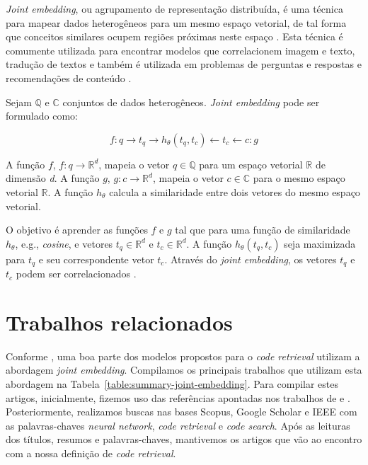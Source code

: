 \textit{Joint embedding}, ou agrupamento de representação distribuída, é uma técnica para mapear dados heterogêneos para um mesmo espaço vetorial, de tal forma que conceitos similares ocupem regiões próximas neste espaço \citep{Gu-deep-code-search:2018}. Esta técnica é comumente utilizada para encontrar modelos que correlacionem imagem e texto, tradução de textos e também é utilizada em problemas de perguntas e respostas e recomendações de conteúdo \citep{lai-etal-2018-review, Zhang:2019:deep-learning-recommender-survey}.

Sejam $\mathbb{Q}$ e $\mathbb{C}$ conjuntos de dados heterogêneos. \textit{Joint embedding} pode ser formulado como:

\begin{equation}
        f: q \rightarrow t_{q} \rightarrow h_{\theta}(t_{q}, t_{c}) \leftarrow t_{c} \leftarrow c :g
\end{equation}

A função $f$, $f: q \rightarrow \mathbb{R}^{d}$, mapeia o vetor  $q \in \mathbb{Q}$ para um espaço vetorial $\mathbb{R}$ de dimensão \emph{d}. A função $g$, $g: c \rightarrow \mathbb{R}^{d}$, mapeia o vetor $c \in \mathbb{C}$ para o mesmo espaço vetorial $\mathbb{R}$. A função $h_{\theta}$ calcula a similaridade entre dois vetores do mesmo espaço vetorial.


O objetivo é aprender as funções $f$ e $g$ tal que para uma função de similaridade $h_{\theta}$, e.g., \textit{cosine}, e vetores $t_{q} \in \mathbb{R}^{d}$ e $t_{c} \in \mathbb{R}^{d}$. A função  $h_{\theta}(t_{q}, t_{c})$ seja maximizada para $t_{q}$ e seu correspondente vetor $t_{c}$.
Através do \textit{joint embedding}, os vetores $t_{q}$ e $t_{c}$ podem ser correlacionados \citep{Gu-deep-code-search:2018, cambronero-deep-learning-code-search:2019}.

    

\section{Trabalhos relacionados}\label{sec:code-retrieval-trabalhos-relacionados}

Conforme \cite{cambronero-deep-learning-code-search:2019}, uma boa parte dos modelos propostos para o \textit{code retrieval} utilizam a abordagem \textit{joint embedding}. Compilamos os principais trabalhos que utilizam esta abordagem na Tabela~\ref{table:summary-joint-embedding}. Para compilar estes artigos, inicialmente, fizemos uso das referências apontadas nos  trabalhos de \citeauthor{Allamanis:2018:SML} e \citeauthor{yao-2018}. Posteriormente, realizamos buscas nas bases Scopus, Google Scholar e IEEE com as palavras-chaves \textit{neural network}, \textit{code retrieval} e \textit{code search}. Após as leituras dos títulos, resumos e palavras-chaves, mantivemos os artigos que vão ao encontro com a nossa definição de \textit{code retrieval}.

